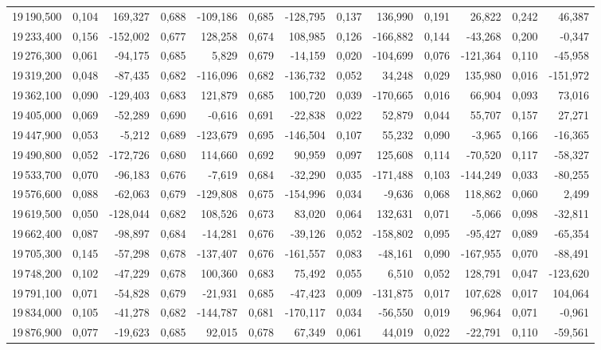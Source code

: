 \begin{longtable}{rrrrrrrrrrrrr}
19\,190,500 & 0,104 & 169,327 & 0,688 & -109,186 & 0,685 & -128,795 & 0,137 & 136,990 & 0,191 & 26,822 & 0,242 & 46,387\\
19\,233,400 & 0,156 & -152,002 & 0,677 & 128,258 & 0,674 & 108,985 & 0,126 & -166,882 & 0,144 & -43,268 & 0,200 & -0,347\\
19\,276,300 & 0,061 & -94,175 & 0,685 & 5,829 & 0,679 & -14,159 & 0,020 & -104,699 & 0,076 & -121,364 & 0,110 & -45,958\\
19\,319,200 & 0,048 & -87,435 & 0,682 & -116,096 & 0,682 & -136,732 & 0,052 & 34,248 & 0,029 & 135,980 & 0,016 & -151,972\\
19\,362,100 & 0,090 & -129,403 & 0,683 & 121,879 & 0,685 & 100,720 & 0,039 & -170,665 & 0,016 & 66,904 & 0,093 & 73,016\\
19\,405,000 & 0,069 & -52,289 & 0,690 & -0,616 & 0,691 & -22,838 & 0,022 & 52,879 & 0,044 & 55,707 & 0,157 & 27,271\\
19\,447,900 & 0,053 & -5,212 & 0,689 & -123,679 & 0,695 & -146,504 & 0,107 & 55,232 & 0,090 & -3,965 & 0,166 & -16,365\\
19\,490,800 & 0,052 & -172,726 & 0,680 & 114,660 & 0,692 & 90,959 & 0,097 & 125,608 & 0,114 & -70,520 & 0,117 & -58,327\\
19\,533,700 & 0,070 & -96,183 & 0,676 & -7,619 & 0,684 & -32,290 & 0,035 & -171,488 & 0,103 & -144,249 & 0,033 & -80,255\\
19\,576,600 & 0,088 & -62,063 & 0,679 & -129,808 & 0,675 & -154,996 & 0,034 & -9,636 & 0,068 & 118,862 & 0,060 & 2,499\\
19\,619,500 & 0,050 & -128,044 & 0,682 & 108,526 & 0,673 & 83,020 & 0,064 & 132,631 & 0,071 & -5,066 & 0,098 & -32,811\\
19\,662,400 & 0,087 & -98,897 & 0,684 & -14,281 & 0,676 & -39,126 & 0,052 & -158,802 & 0,095 & -95,427 & 0,089 & -65,354\\
19\,705,300 & 0,145 & -57,298 & 0,678 & -137,407 & 0,676 & -161,557 & 0,083 & -48,161 & 0,090 & -167,955 & 0,070 & -88,491\\
19\,748,200 & 0,102 & -47,229 & 0,678 & 100,360 & 0,683 & 75,492 & 0,055 & 6,510 & 0,052 & 128,791 & 0,047 & -123,620\\
19\,791,100 & 0,071 & -54,828 & 0,679 & -21,931 & 0,685 & -47,423 & 0,009 & -131,875 & 0,017 & 107,628 & 0,017 & 104,064\\
19\,834,000 & 0,105 & -41,278 & 0,682 & -144,787 & 0,681 & -170,117 & 0,034 & -56,550 & 0,019 & 96,964 & 0,071 & -0,961\\
19\,876,900 & 0,077 & -19,623 & 0,685 & 92,015 & 0,678 & 67,349 & 0,061 & 44,019 & 0,022 & -22,791 & 0,110 & -59,561\\

\end{longtable}
